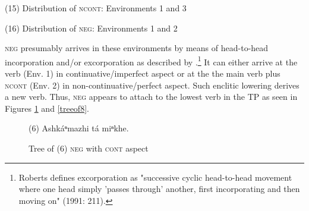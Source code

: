 \documentclass[output=paper]{LSP/langsci}
\begin{document}
\vspace{1em}
(15)	Distribution of \textsc{ncont}:	Environments 1 and 3

\vspace{1em}
(16)	Distribution of \textsc{neg}:	Environments 1 and 2

\vspace{1em}
\textsc{neg} presumably arrives in these environments by means of head-to-head incorporation and/or excorporation as described by \citet{Roberts1991}.\footnote{Roberts defines excorporation as "successive cyclic head-to-head movement where one head simply 'passes through' another, first incorporating and then moving on" (1991: 211).} It can either arrive at the verb (Env. 1) in continuative/imperfect aspect or at the the main verb plus \textsc{ncont} (Env. 2) in non-continuative/perfect aspect. Such enclitic lowering derives a new verb. Thus, \textsc{neg} appears to attach to the lowest verb in the TP as seen in Figures \ref{treeof6} and \ref{treeof8}.

\begin{figure}
\caption{Tree of (6) \textsc{neg} with \textsc{cont} aspect} \label{treeof6}
\begin{center}
(6) Ashk\'aⁿmazhi t\'a miⁿkhe.

\end{center}
\end{figure}
\end{document}
